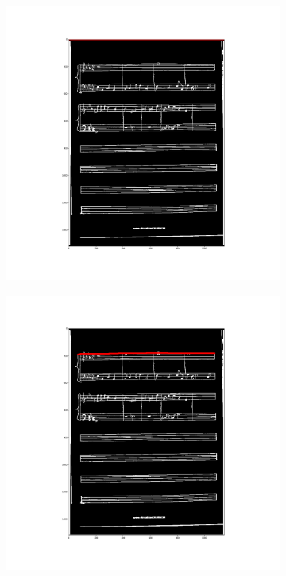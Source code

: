 \documentclass[12pt]{article}
\begin{document}
	\begin{figure}[h!]
		\begin{subfigure}[b]{0.32\linewidth}
			\includegraphics[width=\linewidth]{zdj/BFS0.png}
		\end{subfigure}
		\begin{subfigure}[b]{0.32\linewidth}
			\includegraphics[width=\linewidth]{zdj/BFS1.png}

\end{subfigure}
\end{figure}
\end{document}
